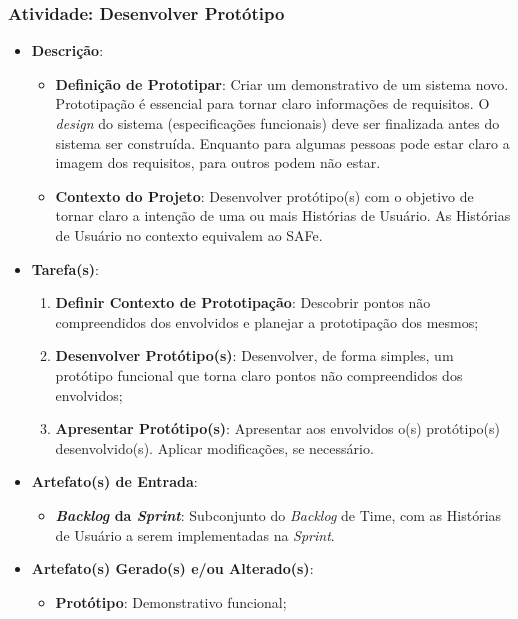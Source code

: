 			\subsubsection[Atividade: Desenvolver Protótipo]{Atividade: Desenvolver Protótipo}
			\label{subsubsec:processo_atividade_time_prototipo}
				\begin{itemize}
					\item{\textbf{Descrição}:
						\begin{itemize}
							\item{\textbf{Definição de Prototipar}: Criar um demonstrativo de um sistema novo. Prototipação é essencial para tornar claro informações de requisitos. O \emph{design} do sistema (especificações funcionais) deve ser finalizada antes do sistema ser construída. Enquanto para algumas pessoas pode estar claro a imagem dos requisitos, para outros podem não estar. \cite{pcmag}}
							\item{\textbf{Contexto do Projeto}: Desenvolver protótipo(s) com o objetivo de tornar claro a intenção de uma ou mais Histórias de Usuário. As Histórias de Usuário no contexto equivalem ao SAFe.}
						\end{itemize}}
					\item{\textbf{Tarefa(s)}:
						\begin{enumerate}
							\item{\textbf{Definir Contexto de Prototipação}: Descobrir pontos não compreendidos dos envolvidos e planejar a prototipação dos mesmos;}
							\item{\textbf{Desenvolver Protótipo(s)}: Desenvolver, de forma simples, um protótipo funcional que torna claro pontos não compreendidos dos envolvidos;}
							\item{\textbf{Apresentar Protótipo(s)}: Apresentar aos envolvidos o(s) protótipo(s) desenvolvido(s). Aplicar modificações, se necessário.}
						\end{enumerate}}
					\item{\textbf{Artefato(s) de Entrada}:
						\begin{itemize}
							\item{\textbf{\emph{Backlog} da \emph{Sprint}}: Subconjunto do \emph{Backlog} de Time, com as Histórias de Usuário a serem implementadas na \emph{Sprint}.}
						\end{itemize}}
					\item{\textbf{Artefato(s) Gerado(s) e/ou Alterado(s)}:
						\begin{itemize}
							\item{\textbf{Protótipo}: Demonstrativo funcional;}

\end{itemize}}
\end{itemize}
